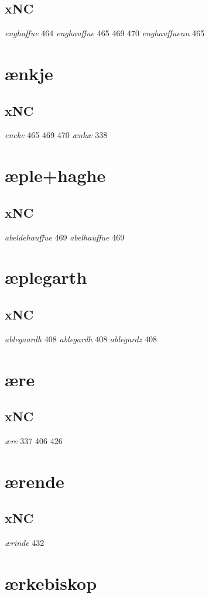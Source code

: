 \documentclass[a4paper,twocolumn]{article}
\begin{document}
\subsection{xNC}
\label{sec:orgb683aa2}
\emph{enghaffue} 464 \emph{enghauffue} 465 469 470 \emph{enghauffuenn} 465 
\section{ænkje}
\label{sec:orge31aeab}
\subsection{xNC}
\label{sec:org903187c}
\emph{encke} 465 469 470 \emph{ænkæ} 338 
\section{æple+haghe}
\label{sec:orge0427bf}
\subsection{xNC}
\label{sec:org73608f0}
\emph{abeldehauffue} 469 \emph{abelhauffue} 469 
\section{æplegarth}
\label{sec:org9dd5ff8}
\subsection{xNC}
\label{sec:orgcd2b248}
\emph{ablegaardh} 408 \emph{ablegardh} 408 \emph{ablegardz} 408 
\section{ære}
\label{sec:org5879267}
\subsection{xNC}
\label{sec:org2c0765a}
\emph{ære} 337 406 426 
\section{ærende}
\label{sec:org8f51d15}
\subsection{xNC}
\label{sec:orgdbc14f3}
\emph{ærinde} 432 
\section{ærkebiskop}
\label{sec:orgc557eeb}
\end{document}

